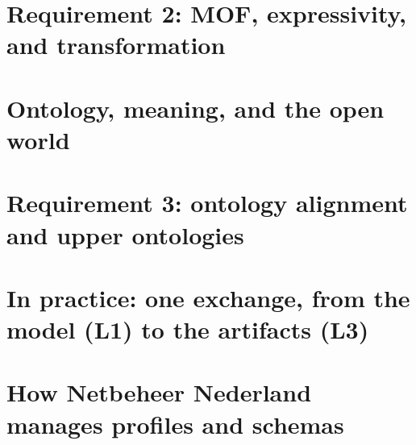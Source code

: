 \documentclass[aspectratio=169]{beamer}
\begin{document}
\section{Requirement 2: MOF, expressivity, and transformation}








\section{Ontology, meaning, and the open world}
% 



\section{Requirement 3: ontology alignment and upper ontologies}






% 


\section{In practice: one exchange, from the model (L1) to the artifacts (L3)}











\section{How Netbeheer Nederland manages profiles and schemas}



\end{document}
